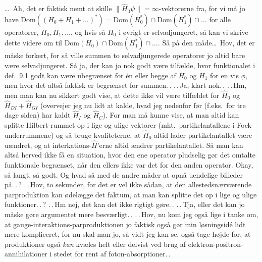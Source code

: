 \documentclass{report}
\begin{document}
\ldots\ Ah, det er faktisk nemt at skille $\|\hat H_0 \psi \|= \infty$-vektorerne fra, for vi må jo have $\mathrm{Dom}((H_0 + H_1 + \ldots)^*) = \mathrm{Dom}(H_0^*) \cap \mathrm{Dom}(H_1^*) \cap \dots$ for alle operatorer, $H_0, H_1, \ldots$, og hvis så $H_0$ i øvrigt er selvadjungeret, så kan vi skrive dette videre om til $\mathrm{Dom}(H_0) \cap \mathrm{Dom}(H_1^*) \cap \dots$. Så på den måde\ldots\ Hov, det er måske forkert, for så ville summen to selvadjungerede operatorer jo altid bare være selvadjungeret. Så ja, der kan jo nok godt være tilfælde, hvor funktionalet i def.\ 9.1 godt kan være ubegrænset for én eller begge af $H_0$ og $H_1$ for en vis $\phi$, men hvor det altså faktisk er begrænset for summen.\,. .\,.\,Ja, klart nok.\,. .\,.\,Hm, men man kan nu sikkert godt vise, at dette ikke vil være tilfældet for $\hat H_0$ og $\hat H_{DI} + \hat H_{GI}$ (overvejer jeg nu lidt at kalde, hvad jeg nedenfor før (f.eks.\ for tre dage siden) har kaldt $\hat H_I$ og $\hat H_C$). For man må kunne vise, at man altid kan splitte Hilbert-rummet op i lige og ulige vektorer (mht.\ partikelantallene i Fock-underrummene) og så bruge kvaliteterne, at $\hat H_0$ altid lader partikelantallet være uændret, og at interkations-$\hat H$'erne altid ændrer partikelantallet. Så man kan altså herved ikke få en situation, hvor den ene operator pludselig gør det omtalte funktionale begrænset, når den ellers ikke var det for den anden operator. Okay, så langt, så godt. Og hvad så med de andre måder at opnå uendelige billeder på.\,.\,? .\,.\,Hov, to sekunder, for det er vel ikke sådan, at den allestedsnærværende parproduktion kan ødelægge det faktum, at man kan splitte det op i lige og ulige funktioner.\,.\,? .\,.\,Hm nej, det kan det ikke rigtigt gøre.\,. .\,.\,Tja, eller det kan jo måske gøre argumentet mere besværligt.\,. .\,.\,Hov, nu kom jeg også lige i tanke om, at gauge-interaktions-parproduktionen jo faktisk også gør min løsningsidé lidt mere kompliceret, for nu skal man jo, så vidt jeg kan se, også tage højde for, at produktioner også \emph{kan} kvæles helt eller delvist ved brug af elektron-positron-annihilationer i stedet for rent af foton-absorptioner.\,. 
\end{document}
